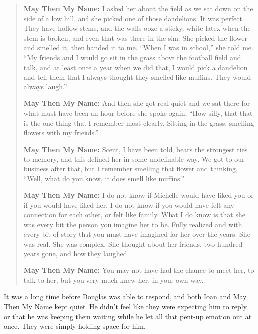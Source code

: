 \begin{quote}
\textbf{May Then My Name:} I asked her about the field as we sat down on the side of a low hill, and she picked one of those dandelions. It was perfect. They have hollow stems, and the walls ooze a sticky, white latex when the stem is broken, and even that was there in the sim. She picked the flower and smelled it, then handed it to me. ``When I was in school,'' she told me. ``My friends and I would go sit in the grass above the football field and talk, and at least once a year when we did that, I would pick a dandelion and tell them that I always thought they smelled like muffins. They would always laugh.''

\textbf{May Then My Name:} And then she got real quiet and we sat there for what must have been an hour before she spoke again, ``How silly, that that is the one thing that I remember most clearly. Sitting in the grass, smelling flowers with my friends.''

\textbf{May Then My Name:} Scent, I have been told, bears the strongest ties to memory, and this defined her in some undefinable way. We got to our business after that, but I remember smelling that flower and thinking, ``Well, what do you know, it does smell like muffins.''

\textbf{May Then My Name:} I do not know if Michelle would have liked you or if you would have liked her. I do not know if you would have felt any connection for each other, or felt like family. What I do know is that she was every bit the person you imagine her to be. Fully realized and with every bit of story that you must have imagined for her over the years. She was real. She was complex. She thought about her friends, two hundred years gone, and how they laughed.

\textbf{May Then My Name:} You may not have had the chance to meet her, to talk to her, but you very much knew her, in your own way.
\end{quote}

It was a long time before Douglas was able to respond, and both Ioan and May Then My Name kept quiet. He didn't feel like they were expecting him to reply or that he was keeping them waiting while he let all that pent-up emotion out at once. They were simply holding space for him.

